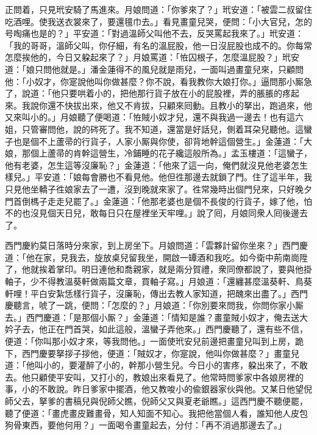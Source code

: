 正問着，只見玳安騎了馬進來。月娘問道：「你爹來了？」玳安道：「被雲二叔留住吃酒哩。使我送衣裳來了，要還氊巾去。」看見畫童兒哭，便問：「小大官兒，怎的号啕痛也是的？」平安道：「對過溫師父叫他不去，反哭罵起我來了。」玳安道：「我的哥哥，溫師父叫，你仔細，有名的溫屁股，他一日沒屁股也成不的。你每常怎麼挨他的，今日又躱起來了？」{}月娘罵道：「恠囚根子，怎麼溫屁股？」玳安道：「娘只問他就是。」潘金蓮得不的風兒就是雨兒，{}一面叫過畫童兒來，只顧問他：「小奴才，你寔說他叫你做甚麼？你不說，看我教你大娘打你。」逼問那小厮急了，說道：「他只要哄着小的，把他那行貨子放在小的屁股裡，弄的脹脹的疼起來。我說你還不快拔出來，他又不肯拔，只顧來囘動。且教小的拏出，跑過來，他又來叫小的。」月娘聽了便喝道：「恠賊小奴才兒，還不與我過一邊去！也有這六姐，只管審問他，說的硶死了。我不知道，還當是好話兒，側着耳朶兒聽他。這蠻子也是個不上蘆帚的行貨子，人家小厮與你使，卻背地幹這個營生。」金蓮道：「大娘，那個上蘆帚的肯幹這營生，{}冷鋪睡的花子纔這般所為。」{}孟玉樓道：「這蠻子，他有老婆，怎生這等沒廉恥？」金蓮道：「他來了這一向，俺們就沒見他老婆怎生樣兒。」平安道：「娘每會勝也不看見他。他但徃那邊去就鎖了門。住了這半年，我只見他坐轎子徃娘家去了一遭，沒到晚就來家了。徃常幾時出個門兒來，只好晚夕門首倒榪子走走兒罷了。」金蓮道：「他那老婆也是個不長俊的行貨子，嫁了他，怕不的也沒見個天日兒，敢每日只在屋裡坐天牢哩。」說了囘，月娘同衆人囘後邊去了。

西門慶約莫日落時分來家，到上房坐下。月娘問道：「雲夥計留你坐來？」西門慶道：「他在家，見我去，旋放桌兒留我坐，開啟一罈酒和我吃。如今衛中荊南崗陞了，他就挨着掌印。明日連他和喬親家，就是兩分賀禮，衆同僚都說了，要與他掛軸子，少不得教溫葵軒做兩篇文章，買軸子寫。」月娘道：「還纏甚麼溫葵軒、鳥葵軒哩！平白安紮恁樣行貨子，沒廉恥，傳出去教人家知道，把醜來出盡了。」西門慶聽言，唬了一跳，{}便問：「怎麼的？」月娘道：「你別要來問我，你問你家小厮去。」西門慶道：「是那個小厮？」金蓮道：「情知是誰？畫童賊小奴才，俺去送大妗子去，他正在門首哭，如此這般，溫蠻子弄他來。」西門慶聽了，還有些不信，便道：「你叫那小奴才來，等我問他。」一面使玳安兒前邊把畫童兒叫到上房，跪下，西門慶要拏拶子拶他，{}便道：「賊奴才，你寔說，他叫你做甚麼？」畫童兒道：「他叫小的，要灌醉了小的，幹那小營生兒。{}今日小的害疼，躱出來了，不敢去。他只顧使平安叫，又打小的，教娘出來看見了。他常時問爹家中各娘房裡的事，小的不敢說。昨日爹家中擺酒，他又教唆小的偸銀器家伙與他。又某日他望倪師父去，拏爹的書稿兒與倪師父瞧，倪師父又與夏老爺瞧。」這西門慶不聽便罷，聽了便道：「畫虎畫皮難畫骨，知人知面不知心。我把他當個人看，誰知他人皮包狗骨東西，要他何用？」{}一面喝令畫童起去，分付：「再不消過那邊去了。」

